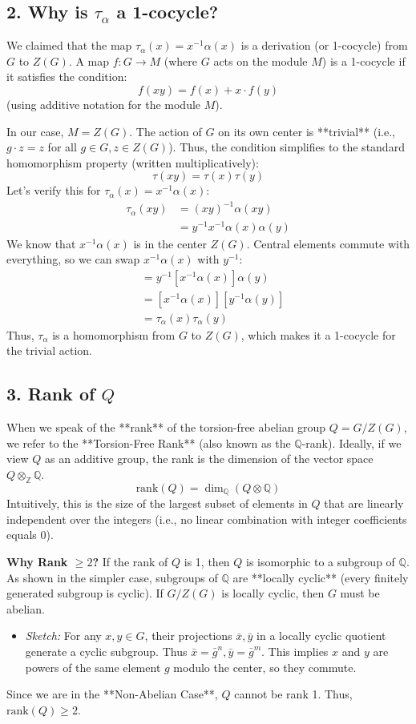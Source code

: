 \documentclass{book}
\newcommand{\Q}{{\mathbb{Q}}}
\newcommand{\Z}{{\mathbb{Z}}}
\begin{document}
\subsection*{2. Why is $\tau_\alpha$ a 1-cocycle?}

We claimed that the map $\tau_\alpha(x) = x^{-1}\alpha(x)$ is a derivation (or 1-cocycle) from $G$ to $Z(G)$.
A map $f: G \to M$ (where $G$ acts on the module $M$) is a 1-cocycle if it satisfies the condition:
\[ f(xy) = f(x) + x \cdot f(y) \]
(using additive notation for the module $M$).

In our case, $M = Z(G)$. The action of $G$ on its own center is **trivial** (i.e., $g \cdot z = z$ for all $g \in G, z \in Z(G)$). Thus, the condition simplifies to the standard homomorphism property (written multiplicatively):
\[ \tau(xy) = \tau(x)\tau(y) \]
Let's verify this for $\tau_\alpha(x) = x^{-1}\alpha(x)$:
\begin{align*}
    \tau_\alpha(xy) &= (xy)^{-1}\alpha(xy) \\
    &= y^{-1}x^{-1}\alpha(x)\alpha(y)
\end{align*}
We know that $x^{-1}\alpha(x)$ is in the center $Z(G)$. Central elements commute with everything, so we can swap $x^{-1}\alpha(x)$ with $y^{-1}$:
\begin{align*}
    &= y^{-1} [x^{-1}\alpha(x)] \alpha(y) \\
    &= [x^{-1}\alpha(x)] [y^{-1}\alpha(y)] \\
    &= \tau_\alpha(x) \tau_\alpha(y)
\end{align*}
Thus, $\tau_\alpha$ is a homomorphism from $G$ to $Z(G)$, which makes it a 1-cocycle for the trivial action.

\subsection*{3. Rank of $Q$}

When we speak of the **rank** of the torsion-free abelian group $Q = G/Z(G)$, we refer to the **Torsion-Free Rank** (also known as the $\Q$-rank).
Ideally, if we view $Q$ as an additive group, the rank is the dimension of the vector space $Q \otimes_{\Z} \Q$.
\[ \text{rank}(Q) = \dim_{\Q} (Q \otimes \Q) \]
Intuitively, this is the size of the largest subset of elements in $Q$ that are linearly independent over the integers (i.e., no linear combination with integer coefficients equals 0).

\textbf{Why Rank $\ge 2$?}
If the rank of $Q$ is 1, then $Q$ is isomorphic to a subgroup of $\Q$.
As shown in the simpler case, subgroups of $\Q$ are **locally cyclic** (every finitely generated subgroup is cyclic).
If $G/Z(G)$ is locally cyclic, then $G$ must be abelian.
\begin{itemize}
    \item \emph{Sketch:} For any $x, y \in G$, their projections $\bar{x}, \bar{y}$ in a locally cyclic quotient generate a cyclic subgroup. Thus $\bar{x} = \bar{g}^n, \bar{y} = \bar{g}^m$. This implies $x$ and $y$ are powers of the same element $g$ modulo the center, so they commute.
\end{itemize}
Since we are in the **Non-Abelian Case**, $Q$ cannot be rank 1. Thus, $\text{rank}(Q) \ge 2$.
\end{document}
